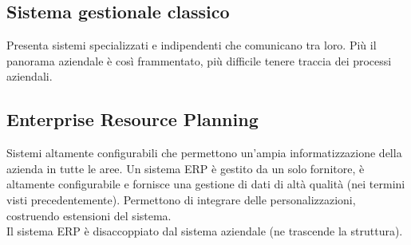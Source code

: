 \subsection{Sistema gestionale classico}
\label{sub:Sistema gestionale classico}
Presenta sistemi specializzati e indipendenti che comunicano tra loro.
Pi\`u il panorama aziendale \`e cos\`i frammentato, pi\`u difficile tenere
traccia dei processi aziendali.
\subsection{Enterprise Resource Planning}
\label{sub:Enterprise Resource Planning}
Sistemi altamente configurabili che permettono un'ampia informatizzazione
della azienda in tutte le aree. Un sistema ERP \`e gestito da un solo fornitore,
\`e altamente configurabile e fornisce una gestione di dati di alt\`a qualit\`a
(nei termini visti precedentemente). Permettono di integrare delle personalizzazioni,
costruendo estensioni del sistema.\\
Il sistema ERP \`e disaccoppiato dal sistema aziendale (ne trascende la struttura).\\

